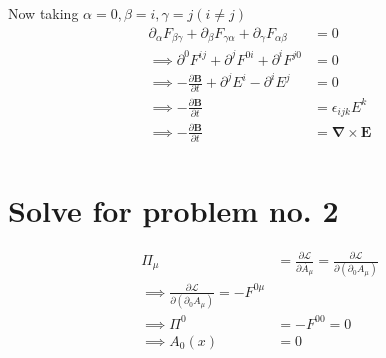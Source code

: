 \documentclass[12pt, letterpaper]{article}
\newcommand*{\1}{\hspace{1pt}}
\begin{document}
Now taking $\alpha=0, \beta=i, \gamma=j (i\neq j)$
\begin{align*}
    \partial_{\alpha} F_{\beta \gamma} + \partial_{\beta} F_{\gamma \alpha} + \partial_{\gamma} F_{\alpha \beta} &= 0\\
    \implies \partial^{0} F^{ij} + \partial^{j} F^{0i} + \partial^{i} F^{j0} &= 0\\
    \implies -\frac{\partial \boldsymbol{B}}{\partial t} + \partial^{j} E^{i} - \partial^{i} E^{j} &= 0\\
    \implies -\frac{\partial \boldsymbol{B}}{\partial t} &= \epsilon_{ijk} E^{k} \\
    \implies -\frac{\partial \boldsymbol{B}}{\partial t} &= \boldsymbol{\nabla} \times \boldsymbol{E} \\
\end{align*}

\section*{Solve for problem no. 2}

\begin{align*}
    \Pi  _{\mu} &= \frac{\partial \mathcal{L}}{\partial \dot{A_{\mu}} } = \frac{\partial \mathcal{L}}{\partial (\partial _{0}A_{\mu})}  \\
    \implies \frac{\partial \mathcal{L}}{\partial (\partial _{0}A_{\mu})} = - F^{0\mu} \\
    \implies \Pi ^{0} &= - F^{00} = 0 \\
    \implies A_{0} (x) &= 0 \\
\end{align*}
\end{document}
